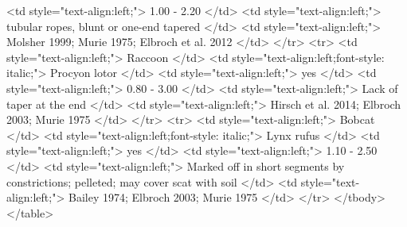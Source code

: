    <td style="text-align:left;"> 1.00 - 2.20 </td>
   <td style="text-align:left;"> tubular ropes, blunt or one-end tapered </td>
   <td style="text-align:left;"> Molsher 1999; Murie 1975; Elbroch et al. 2012 </td>
  </tr>
  <tr>
   <td style="text-align:left;"> Raccoon </td>
   <td style="text-align:left;font-style: italic;"> Procyon lotor </td>
   <td style="text-align:left;"> yes </td>
   <td style="text-align:left;"> 0.80 - 3.00 </td>
   <td style="text-align:left;"> Lack of taper at the end </td>
   <td style="text-align:left;"> Hirsch et al. 2014; Elbroch 2003; Murie 1975 </td>
  </tr>
  <tr>
   <td style="text-align:left;"> Bobcat </td>
   <td style="text-align:left;font-style: italic;"> Lynx rufus </td>
   <td style="text-align:left;"> yes </td>
   <td style="text-align:left;"> 1.10 - 2.50 </td>
   <td style="text-align:left;"> Marked off in short segments by constrictions; pelleted; may cover scat with soil </td>
   <td style="text-align:left;"> Bailey 1974; Elbroch 2003; Murie 1975 </td>
  </tr>
</tbody>
</table>
